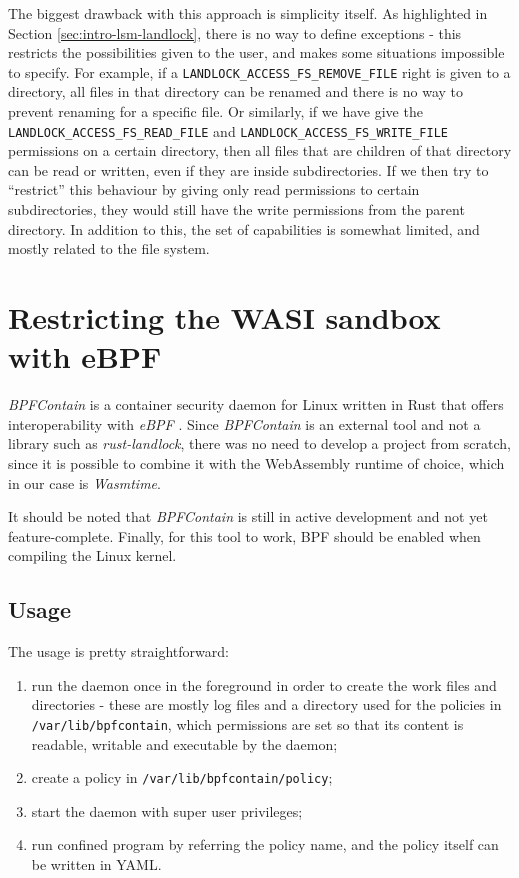 The biggest drawback with this approach is simplicity itself. As highlighted in Section \ref{sec:intro-lsm-landlock},
there is no way to define exceptions - this restricts the possibilities given to the user, and makes some situations
impossible to specify. For example, if a \texttt{LANDLOCK\_ACCESS\_FS\_REMOVE\_FILE} right is given to a directory,
all files in that directory can be renamed and there is no way to prevent renaming for a specific file.
Or similarly, if we have give the \texttt{LANDLOCK\_ACCESS\_FS\_READ\_FILE} and \texttt{LANDLOCK\_ACCESS\_FS\_WRITE\_FILE}
permissions on a certain directory, then all files that are children of that directory can be read or written, even
if they are inside subdirectories. If we then try to ``restrict'' this behaviour by giving only read permissions to
certain subdirectories, they would still have the write permissions from the parent directory.
In addition to this, the set of capabilities is somewhat limited, and mostly related to the file system.

\clearpage
\section{Restricting the WASI sandbox with eBPF}
\label{sec:restricting-wasi-ebpf}

\textit{BPFContain} \cite{bpfcontain} is a container security daemon for Linux written in Rust that offers
interoperability with \textit{eBPF} \cite{ebpf}.
Since \textit{BPFContain} is an external tool and not a library such as \textit{rust-landlock}, there was no need
to develop a project from scratch, since it is possible to combine it with the WebAssembly runtime of choice, which
in our case is \textit{Wasmtime}.

It should be noted that \textit{BPFContain} is still in active development and not yet feature-complete.
Finally, for this tool to work, BPF should be enabled when compiling the Linux kernel.

\subsection{Usage}

The usage is pretty straightforward:
\begin{enumerate}
  \item run the daemon once in the foreground in order to create the work files and directories -
        these are mostly log files and a directory used for the policies in \texttt{/var/lib/bpfcontain},
        which permissions are set so that its content is readable, writable and executable by the daemon;
  \item create a policy in \texttt{/var/lib/bpfcontain/policy};
  \item start the daemon with super user privileges;
  \item run confined program by referring the policy name, and the policy itself can be written in YAML.
\end{enumerate}

